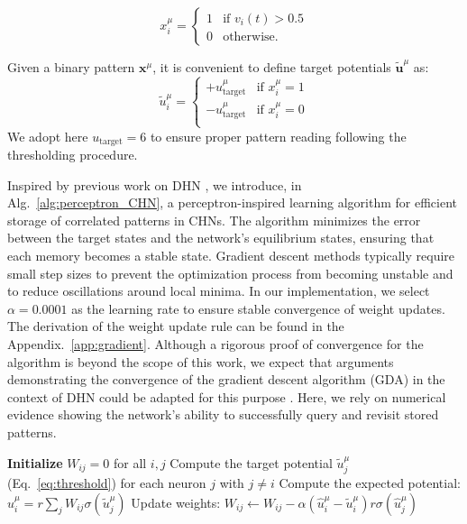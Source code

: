 \documentclass[10pt,letterpaper]{article}
\begin{document}
\begin{equation}
x^{\mu}_i = 
\begin{cases} 
1 & \text{if } v_i(t)>0.5 \\
0 & \text{otherwise.}
\end{cases}
\label{eq:reading}
\end{equation}

Given a binary pattern $\mathbf{x}^{\mu}$, it is convenient to define target potentials $\tilde{\mathbf{u}}^{\mu}$ as:
\begin{equation}
    \tilde{u}_i^{\mu} = 
    \begin{cases} 
    +u_{\text{target}}^{\mu} & \text{if } x_i^{\mu} = 1 \\
    -u_{\text{target}}^{\mu} & \text{if } x_i^{\mu} = 0 \\
    \end{cases}
    \label{eq:threshold}
\end{equation}
We adopt here $u_{\text{target}}=6$ to ensure proper pattern reading following the thresholding procedure.

Inspired by previous work on DHN \cite{diederich_learning_1987}, we introduce, in Alg.~\ref{alg:perceptron_CHN}, a perceptron-inspired 
learning algorithm for efficient storage of correlated patterns in CHNs. 
The algorithm minimizes the error between the target states and the network's equilibrium states, ensuring that each memory becomes a stable state. 
Gradient descent methods typically require small step sizes to prevent the optimization process from becoming unstable and to reduce oscillations around local minima. In our implementation, we select $\alpha = 0.0001$ as the learning rate to ensure stable convergence of weight updates.
The derivation of the weight update rule can be found in the Appendix.~\ref{app:gradient}.
%
Although a rigorous proof of convergence for the algorithm is beyond the scope of this work, we expect that arguments demonstrating the convergence of the gradient descent algorithm (GDA) in the context of DHN could be adapted for this purpose \cite{diederich_learning_1987}. 
Here, we rely on numerical evidence showing the network's ability to successfully
query and revisit stored patterns. 

\begin{algorithm}[h] 
\caption{Gradient descent for the storage of correlated patterns (GDA)}
\begin{algorithmic}[1]
\State \textbf{Initialize} $W_{ij} = 0$ for all $i, j$
\Repeat
            \State Compute the target potential $\tilde{u}^{\mu}_j$ (Eq.~\ref{eq:threshold}) for each neuron $j$ with $j\neq i$
            \State Compute the expected potential: $\hat{u}^{\mu}_i = r\sum_j W_{ij} \sigma(\tilde{u}^{\mu}_j)$
            \State Update weights: $W_{ij} \leftarrow W_{ij} - \alpha (\hat{u}^{\mu}_i- \tilde{u}^{\mu}_i) r \sigma(\hat{u}^{\mu}_j)$
        \EndFor
    \EndFor 
{}
\end{algorithmic}
\label{alg:perceptron_CHN}
\end{algorithm}
\end{document}
